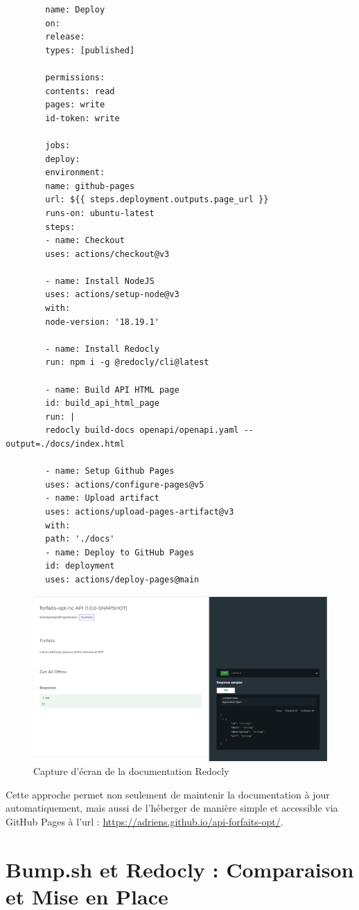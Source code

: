 \documentclass{article}
\begin{document}
	\begin{lstlisting}
		name: Deploy
		on:
		release:
		types: [published]
		
		permissions:
		contents: read
		pages: write
		id-token: write
		
		jobs:
		deploy:
		environment:
		name: github-pages
		url: ${{ steps.deployment.outputs.page_url }}
		runs-on: ubuntu-latest
		steps:
		- name: Checkout
		uses: actions/checkout@v3
		
		- name: Install NodeJS
		uses: actions/setup-node@v3
		with:
		node-version: '18.19.1'
		
		- name: Install Redocly
		run: npm i -g @redocly/cli@latest
		
		- name: Build API HTML page
		id: build_api_html_page
		run: |
		redocly build-docs openapi/openapi.yaml --output=./docs/index.html
		
		- name: Setup Github Pages
		uses: actions/configure-pages@v5
		- name: Upload artifact
		uses: actions/upload-pages-artifact@v3
		with:
		path: './docs'
		- name: Deploy to GitHub Pages
		id: deployment
		uses: actions/deploy-pages@main
	\end{lstlisting}
	\begin{figure}[h!]
		\centering
		\includegraphics[width=\textwidth]{asset/redocly.png}
		\caption{Capture d'écran de la documentation Redocly}
	\end{figure}
	
	Cette approche permet non seulement de maintenir la documentation à jour automatiquement, mais aussi de l'héberger de manière simple et accessible via GitHub Pages à l'url : \url{https://adriens.github.io/api-forfaits-opt/}.
	
	\section{Bump.sh et Redocly : Comparaison et Mise en Place}
	
\end{document}
